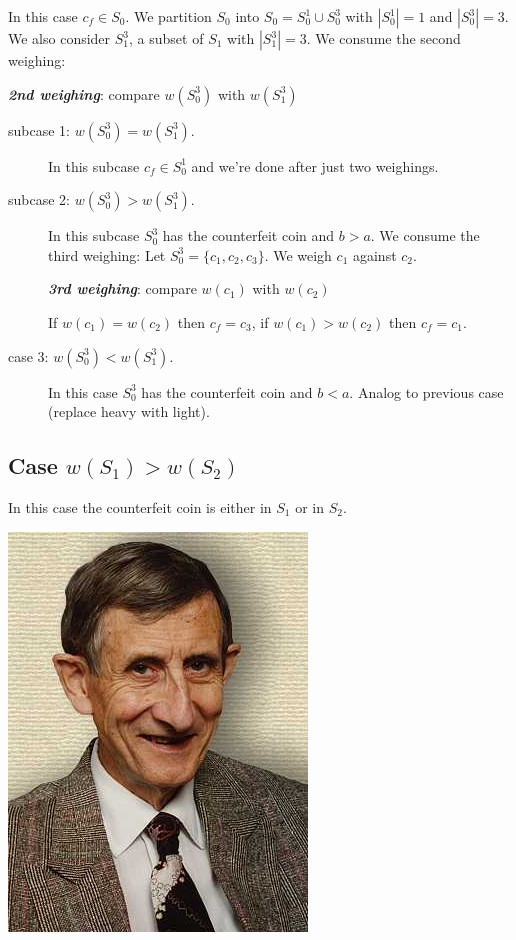 In this case $c_f \in S_0$. We partition $S_0$ into $S_0 = S_0^1 \cup S_0^3$ with $| S_0^1 | = 1$ and 
$| S_0^3 | = 3$. We also consider $S_1^3$, a subset of $S_1$ with $| S_1^3 | = 3$. We consume the second weighing:
\begin{center} \textbf{\textit{2nd weighing}}: compare $w(S_0^3)$ with $w(S_1^3)$ \end{center}

\begin{description}
	\item [ subcase 1: $w(S_0^3) = w(S_1^3)$. ] In this subcase $c_f \in S_0^1$ and we're done after just two weighings.
	\item [ subcase 2: $w(S_0^3) > w(S_1^3)$. ] In this subcase $S_0^3$ has the counterfeit coin and $b > a$. We consume the third weighing: Let $S_0^3 = \{ c_1, c_2, c_3 \}$. We weigh $c_1$ against $c_2$.
\begin{center} \textbf{\textit{3rd weighing}}: compare $w(c_1)$ with $w(c_2)$ \end{center}
If $w(c_1) = w(c_2)$ then $c_f = c_3$, if $w(c_1) > w(c_2)$ then $c_f = c_1$.
	\item	[ case 3: $w(S_0^3) < w(S_1^3)$. ]  In this case $S_0^3$ has the counterfeit coin and $b < a$. Analog to previous case (replace heavy with light).
\end{description}

\subsection{Case $w(S_1) > w(S_2)$}

In this case the counterfeit coin is either in $S_1$ or in $S_2$.

\begin{marginfigure}[0.0in]
\includegraphics[scale=0.5]{freeman.jpg}
\end{marginfigure}

